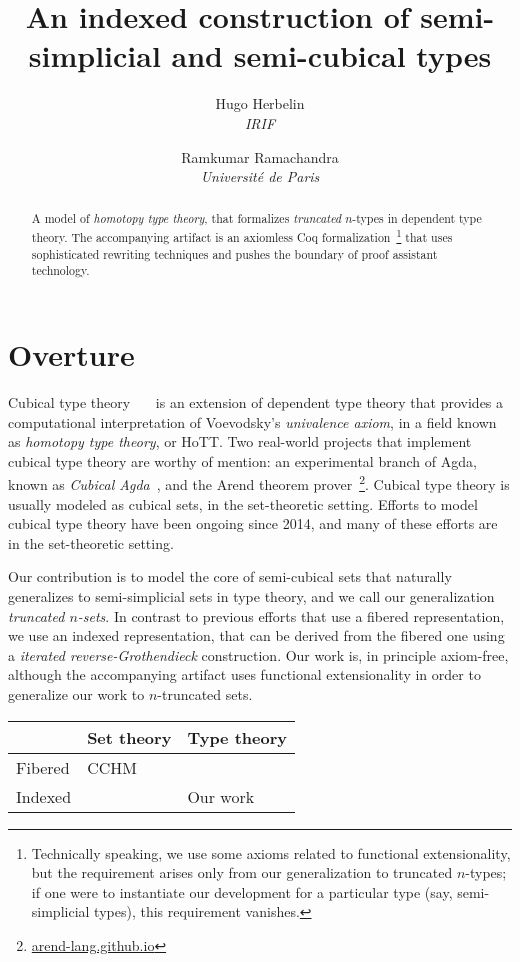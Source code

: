 \documentclass[10pt]{art}
\title{An indexed construction of semi-simplicial and semi-cubical types}
\author{
  \textcolor{gray80}{Hugo Herbelin} \\
  \itshape \textcolor{gray80}{IRIF}
  \and
  \textcolor{gray80}{Ramkumar Ramachandra} \\
  \itshape \textcolor{gray80}{Université de Paris}
}
\date{}
\begin{document}
\thispagestyle{empty}
\maketitle
\begin{abstract}
  A model of \emph{homotopy type theory}, that formalizes \emph{truncated} $n$-types in dependent type theory. The accompanying artifact is an axiomless Coq formalization~\footnote{Technically speaking, we use some axioms related to functional extensionality, but the requirement arises only from our generalization to truncated $n$-types; if one were to instantiate our development for a particular type (say, semi-simplicial types), this requirement vanishes.} that uses sophisticated rewriting techniques and pushes the boundary of proof assistant technology.
\end{abstract}
\tableofcontents
\newpage

\section{Overture}
Cubical type theory~\cite{Bezem14}~\cite{Cohen16}~\cite{Angiuli17} is an extension of dependent type theory that provides a computational interpretation of Voevodsky's \emph{univalence axiom}, in a field known as \emph{homotopy type theory}, or HoTT. Two real-world projects that implement cubical type theory are worthy of mention: an experimental branch of Agda, known as \emph{Cubical Agda}~\cite{Vezzosi21}, and the Arend theorem prover~\footnote{\href{https://arend-lang.github.io}{arend-lang.github.io}}. Cubical type theory is usually modeled as cubical sets, in the set-theoretic setting. Efforts to model cubical type theory have been ongoing since 2014, and many of these efforts are in the set-theoretic setting.

Our contribution is to model the core of semi-cubical sets that naturally generalizes to semi-simplicial sets in type theory, and we call our generalization \emph{truncated $n$-sets}. In contrast to previous efforts that use a fibered representation, we use an indexed representation, that can be derived from the fibered one using a \emph{iterated reverse-Grothendieck} construction. Our work is, in principle axiom-free, although the accompanying artifact uses functional extensionality in order to generalize our work to $n$-truncated sets.

\begin{table}[H]
  \begin{tabularx}{\linewidth}{p{.3\linewidth}|p{.3\linewidth}|p{.3\linewidth}}
    \toprule
            & Set theory & Type theory \\
    \midrule
    Fibered & CCHM       &             \\
    \midrule
    Indexed &            & Our work    \\
    \bottomrule
  \end{tabularx}
\end{table}
\end{document}
